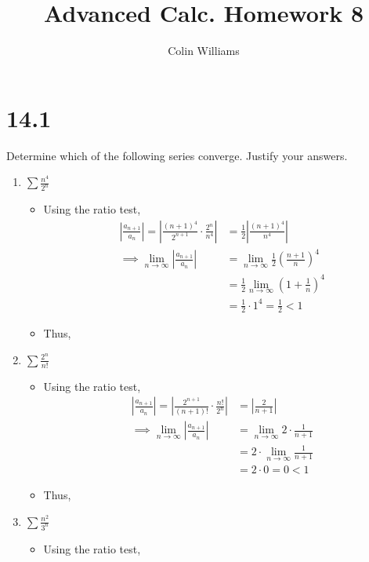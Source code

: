 \documentclass[10pt,a4paper]{article}
\title{Advanced Calc. Homework 8}
\author{Colin Williams}
\theoremstyle{definition}
\begin{document}
\maketitle

\section*{14.1}
Determine which of the following series converge. Justify your answers.
\begin{enumerate}[label = (\alph*)]
\item $\displaystyle \sum \frac{n^4}{2^n}$
	\begin{itemize}
	\item Using the ratio test, 
	\begin{align*}
	\left|\frac{a_{n+1}}{a_n}\right| = \left|\frac{(n+1)^4}{2^{n+1}} \cdot \frac{2^n}{n^4}\right| &= \frac{1}{2}\left|\frac{(n + 1)^4}{n^4}\right|\\
	\implies \lim_{n \to \infty} \left|\frac{a_{n+1}}{a_n}\right| &= \lim_{n \to \infty} \frac{1}{2}\left(\frac{n + 1}{n}\right)^4\\
	&= \frac{1}{2}\lim_{n \to \infty}\left(1 + \frac{1}{n}\right)^4\\
	&= \frac{1}{2}\cdot 1^4 = \frac{1}{2} < 1
	\end{align*}
	\item Thus, 
	\end{itemize}
\item $\displaystyle \sum \frac{2^n}{n!}$
	\begin{itemize}
	\item Using the ratio test,
	\begin{align*}
	\left|\frac{a_{n+1}}{a_n}\right| = \left|\frac{2^{n+1}}{(n+1)!} \cdot \frac{n!}{2^n}\right| &= \left|\frac{2}{n + 1}\right|\\
	\implies \lim_{n \to \infty}\left|\frac{a_{n+1}}{a_n}\right| &= \lim_{n \to \infty} 2 \cdot \frac{1}{n+1}\\
	&= 2 \cdot \lim_{n \to \infty} \frac{1}{n+1}\\
	&= 2 \cdot 0 = 0 < 1
	\end{align*}
	\item Thus, 
	\end{itemize}
\item $\displaystyle \sum \frac{n^2}{3^n}$
	\begin{itemize}
	\item Using the ratio test,

\end{itemize}
\end{enumerate}
\end{document}
